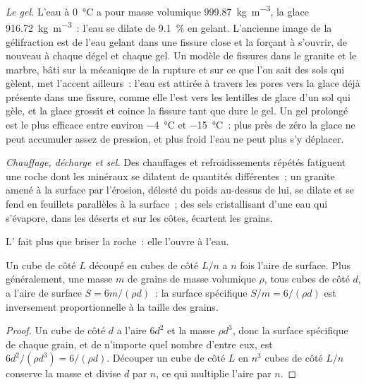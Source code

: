 \emph{Le gel.} L'eau à \qty{0}{\celsius} a pour masse volumique
\qty{999.87}{kg.m^{-3}}, la glace \qty{916.72}{kg.m^{-3}}~: l'eau se dilate de
\qty{9.1}{\percent} en gelant. L'ancienne image de la gélifraction est
de l'eau gelant dans une fissure close et la forçant à s'ouvrir, de nouveau à chaque dégel et
chaque gel. Un modèle de fissures dans le granite et le marbre, bâti sur la mécanique de la rupture
et sur ce que l'on sait des sols qui gèlent, met l'accent ailleurs~: l'eau est
attirée à travers les pores vers la glace déjà présente dans une fissure, comme elle l'est vers les
lentilles de glace d'un sol qui gèle, et la glace grossit et coince la fissure tant que
dure le gel. Un gel prolongé est le plus efficace entre environ
\qty{-4}{\celsius} et \qty{-15}{\celsius}~: plus près de zéro la glace ne peut
accumuler assez de pression, et plus froid l'eau ne peut plus s'y déplacer.

\emph{Chauffage, décharge et sel.} Des chauffages et refroidissements répétés fatiguent une
roche dont les minéraux se dilatent de quantités différentes~; un granite amené à la
surface par l'érosion, délesté du poids au-dessus de lui, se dilate et se fend en
feuillets parallèles à la surface~; des sels cristallisant d'une eau qui s'évapore,
dans les déserts et sur les côtes, écartent les grains.

L' fait plus que briser la roche~: elle l'ouvre à l'eau.

\begin{proposition}\label{prop:b1:weathering-clays:surface}
Un cube de côté $L$ découpé en cubes de côté $L/n$ a $n$ fois l'aire de
surface. Plus généralement, une masse $m$ de grains de masse volumique $\rho$, tous cubes de côté
$d$, a l'aire de surface $S = 6m/(\rho d)$~: la surface spécifique $S/m =
6/(\rho d)$ est inversement proportionnelle à la taille des grains.
\end{proposition}

\begin{proof}
Un cube de côté $d$ a l'aire $6d^2$ et la masse $\rho d^3$, donc la
surface spécifique de chaque grain, et de n'importe quel nombre d'entre eux, est $6d^2/(\rho d^3)
= 6/(\rho d)$. Découper un cube de côté $L$ en $n^3$ cubes de côté $L/n$ conserve
la masse et divise $d$ par $n$, ce qui multiplie l'aire par $n$.
\end{proof}


